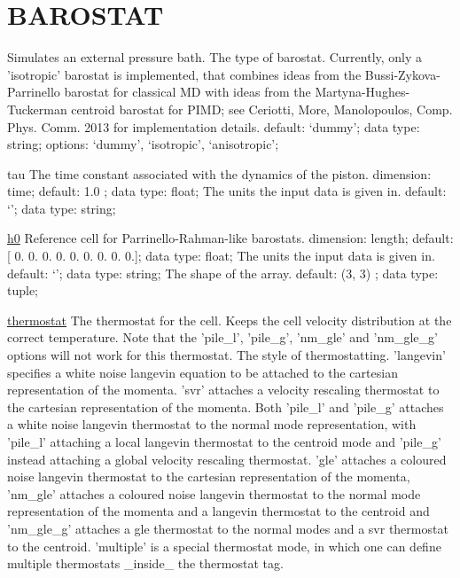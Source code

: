 \section{BAROSTAT}
\label{BAROSTAT}
\begin{ipifield}{}%
{Simulates an external pressure bath.}%
{}%
{%
{The type of barostat.  Currently, only a 'isotropic' barostat is implemented, that combines
                                   ideas from the Bussi-Zykova-Parrinello barostat for classical MD with ideas from the
                                   Martyna-Hughes-Tuckerman centroid barostat for PIMD; see Ceriotti, More, Manolopoulos, Comp. Phys. Comm. 2013 for
                                   implementation details.}%
{default: `dummy'; data type: string; options: `dummy', `isotropic', `anisotropic'; }%
}
\begin{ipifield}{tau}%
{The time constant associated with the dynamics of the piston.}%
{dimension: time; default:  1.0 ; data type: float; }%
{%
{The units the input data is given in.}%
{default: `'; data type: string; }%
}
\end{ipifield}
\begin{ipifield}{\hyperref[CELL]{h0}}%
{Reference cell for Parrinello-Rahman-like barostats.}%
{dimension: length; default: 
      [ 0.  0.  0.  0.  0.  0.  0.  0.  0.]; data type: float; }%
{%
{The units the input data is given in.}%
{default: `'; data type: string; }%
%
{The shape of the array.}%
{default:  (3, 3) ; data type: tuple; }%
}
\end{ipifield}
\begin{ipifield}{\hyperref[THERMOSTATS]{thermostat}}%
{The thermostat for the cell. Keeps the cell velocity distribution at the correct temperature. Note that the 'pile\_l', 'pile\_g', 'nm\_gle' and 'nm\_gle\_g' options will not work for this thermostat.}%
{}%
{%
{The style of thermostatting. 'langevin' specifies a white noise langevin equation to be attached to the cartesian representation of the momenta. 'svr' attaches a velocity rescaling thermostat to the cartesian representation of the momenta. Both 'pile\_l' and 'pile\_g' attaches a white noise langevin thermostat to the normal mode representation, with 'pile\_l' attaching a local langevin thermostat to the centroid mode and 'pile\_g' instead attaching a global velocity rescaling thermostat. 'gle' attaches a coloured noise langevin thermostat to the cartesian representation of the momenta, 'nm\_gle' attaches a coloured noise langevin thermostat to the normal mode representation of the momenta and a langevin thermostat to the centroid and 'nm\_gle\_g' attaches a gle thermostat to the normal modes and a svr thermostat to the centroid.  'multiple' is a special thermostat mode, in which one can define multiple thermostats \_inside\_ the thermostat tag.}%
}
\end{ipifield}
\end{ipifield}

